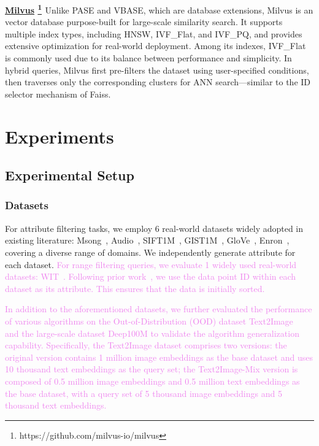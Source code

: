 \documentclass[sigconf, nonacm]{acmart}
\begin{document}
	\noindent\textbf{\underline{Milvus} \footnote{https://github.com/milvus-io/milvus} \cite{milvus}}
	Unlike PASE and VBASE, which are database extensions, Milvus is an vector database purpose-built for large-scale similarity search. It supports multiple index types, including HNSW, IVF\_Flat, and IVF\_PQ, and provides extensive optimization for real-world deployment. Among its indexes, IVF\_Flat is commonly used due to its balance between performance and simplicity. In hybrid queries, Milvus first pre-filters the dataset using user-specified conditions, then traverses only the corresponding clusters for ANN search—similar to the ID selector mechanism of Faiss.
	
	\section{Experiments}
	\subsection{Experimental Setup}
	\subsubsection{Datasets}
	
	For attribute filtering tasks, we employ 6 real-world datasets widely adopted in existing literature: Msong~\cite{msong2011}, Audio~\cite{audio_unknown}, SIFT1M~\cite{sift2010}, GIST1M~\cite{sift2010}, GloVe~\cite{GloVe2015}, Enron~\cite{enron2015}, covering a diverse range of domains. We independently generate attribute for each dataset.
	\textcolor{violet}{	For range filtering queries, we evaluate 1 widely used real-world datasets: WIT~\cite{wit_dataset}. Following prior work~\cite{DSG}, we use the data point ID within each dataset as its attribute. This ensures that the data is initially sorted.}
		
	\textcolor{violet}{In addition to the aforementioned datasets, we further evaluated the performance of various algorithms on the Out-of-Distribution (OOD) dataset Text2Image~\cite{texttoimage} and the large-scale dataset Deep100M to validate the algorithm generalization capability. Specifically, the Text2Image dataset comprises two versions: the original version contains 1 million image embeddings as the base dataset and uses 10 thousand text embeddings as the query set; the Text2Image-Mix version is composed of 0.5 million image embeddings and 0.5 million text embeddings as the base dataset, with a query set of 5 thousand image embeddings and 5 thousand text embeddings.}
	
\end{document}
